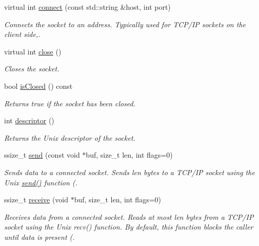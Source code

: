 \begin{DoxyCompactItemize}
virtual int \mbox{\hyperlink{classcppu_1_1_socket_af6db3840caee709738f0e2a9ff814e5d}{connect}} (const std\+::string \&host, int port)
\begin{DoxyCompactList}\small\item\em Connects the socket to an address. Typically used for T\+C\+P/\+IP sockets on the client side,. \end{DoxyCompactList}\item 
virtual int \mbox{\hyperlink{classcppu_1_1_socket_ab958ef8a0f0495cf3a1c57a2ad4a34fc}{close}} ()
\begin{DoxyCompactList}\small\item\em Closes the socket. \end{DoxyCompactList}\item 
\mbox{\label{classcppu_1_1_socket_a2eeeafa5f475525e1cd8116721723410}} 
bool \mbox{\hyperlink{classcppu_1_1_socket_a2eeeafa5f475525e1cd8116721723410}{is\+Closed}} () const
\begin{DoxyCompactList}\small\item\em Returns true if the socket has been closed. \end{DoxyCompactList}\item 
\mbox{\label{classcppu_1_1_socket_a06a8fcd9518e6a3e8b33bb64f7fb9036}} 
int \mbox{\hyperlink{classcppu_1_1_socket_a06a8fcd9518e6a3e8b33bb64f7fb9036}{descriptor}} ()
\begin{DoxyCompactList}\small\item\em Returns the Unix descriptor of the socket. \end{DoxyCompactList}\item 
ssize\+\_\+t \mbox{\hyperlink{classcppu_1_1_socket_aeac77f859159715e2d63a5a0dc118788}{send}} (const void $\ast$buf, size\+\_\+t len, int flags=0)
\begin{DoxyCompactList}\small\item\em Sends data to a connected socket. Sends {\itshape len} bytes to a T\+C\+P/\+IP socket using the Unix \mbox{\hyperlink{classcppu_1_1_socket_aeac77f859159715e2d63a5a0dc118788}{send()}} function (. \end{DoxyCompactList}\item 
ssize\+\_\+t \mbox{\hyperlink{classcppu_1_1_socket_a37c382af52cc02f92c0e19a0c6e0e04f}{receive}} (void $\ast$buf, size\+\_\+t len, int flags=0)
\begin{DoxyCompactList}\small\item\em Receives data from a connected socket. Reads at most {\itshape len} bytes from a T\+C\+P/\+IP socket using the Unix recv() function. By default, this function blocks the caller until data is present (. \end{DoxyCompactList}\item 

\end{DoxyCompactItemize}
